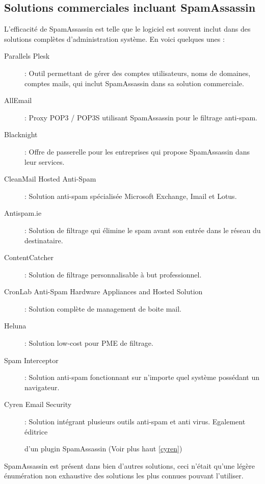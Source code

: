 \documentclass[a4paper,11pt]{article}
\begin{document}
\subsection{Solutions commerciales incluant SpamAssassin}
L'efficacité de SpamAssassin est telle que le logiciel est souvent inclut dans des solutions complètes d'administration système. En voici quelques unes : 
\begin{description}
\item [Parallels Plesk] : Outil permettant de gérer des comptes utilisateurs, noms de domaines, comptes mails, qui inclut SpamAssassin dans sa solution commerciale.
\item [AllEmail] : Proxy POP3 / POP3S utilisant SpamAssassin pour le filtrage anti-spam.
\item [Blacknight] : Offre de passerelle pour les entreprises qui propose SpamAssassin dans leur services.
\item [CleanMail Hosted Anti-Spam] : Solution anti-spam spécialisée Microsoft Exchange, Imail et Lotus.
\item [Antispam.ie] : Solution de filtrage qui élimine le spam avant son entrée dans le réseau du destinataire.
\item [ContentCatcher] : Solution de filtrage personnalisable à but professionnel.
\item [CronLab Anti-Spam Hardware Appliances and Hosted Solution] : Solution complète de management de boite mail.
\item [Heluna] : Solution low-cost pour PME de filtrage.
\item [Spam Interceptor] : Solution anti-spam fonctionnant sur n'importe quel système possédant un navigateur.
\item [Cyren Email Security]: Solution intégrant plusieurs outils anti-spam et anti virus. Egalement éditrice 

d'un plugin SpamAssassin (Voir plus haut \ref{cyren})
\end{description}

SpamAssassin est présent dans bien d'autres solutions, ceci n'était qu'une légère énumération non exhaustive des solutions les plus connues pouvant l'utiliser.
\end{document}
